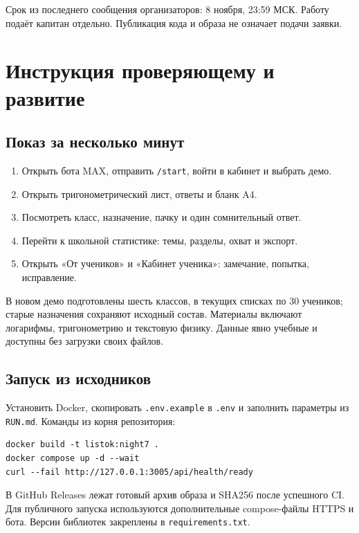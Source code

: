 \documentclass[a4paper,11pt]{article}
\begin{document}
Срок из последнего сообщения организаторов: 8 ноября, 23:59 МСК.
Работу подаёт капитан отдельно. Публикация кода и образа не означает подачи заявки.
\newpage
\section{Инструкция проверяющему и развитие}
\subsection{Показ за несколько минут}
\begin{enumerate}
\item Открыть бота MAX, отправить \texttt{/start}, войти в кабинет и выбрать демо.
\item Открыть тригонометрический лист, ответы и бланк A4.
\item Посмотреть класс, назначение, пачку и один сомнительный ответ.
\item Перейти к школьной статистике: темы, разделы, охват и экспорт.
\item Открыть «От учеников» и «Кабинет ученика»: замечание, попытка, исправление.
\end{enumerate}
В новом демо подготовлены шесть классов, в текущих списках по 30 учеников;
старые назначения сохраняют исходный состав. Материалы включают логарифмы,
тригонометрию и текстовую физику. Данные явно учебные и доступны без загрузки своих файлов.

\subsection{Запуск из исходников}
Установить Docker, скопировать \texttt{.env.example} в \texttt{.env} и заполнить
параметры из \texttt{RUN.md}. Команды из корня репозитория:
\begin{verbatim}
docker build -t listok:night7 .
docker compose up -d --wait
curl --fail http://127.0.0.1:3005/api/health/ready
\end{verbatim}
В GitHub Releases лежат готовый архив образа и SHA256 после успешного CI.
Для публичного запуска используются дополнительные compose-файлы HTTPS и бота.
Версии библиотек закреплены в \texttt{requirements.txt}.
\end{document}
